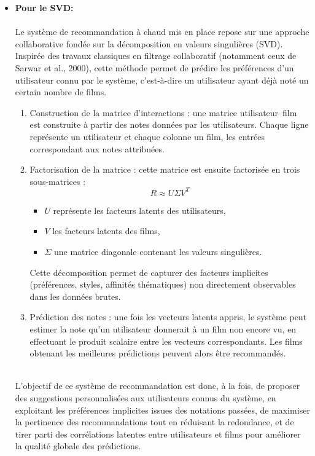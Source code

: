 \documentclass{article}
\begin{document}
\begin{itemize}
    \item \textbf{Pour le SVD:} \\
          $ $\\
          Le système de recommandation à chaud mis en place repose sur une approche collaborative fondée sur la décomposition en valeurs singulières (SVD).
          Inspirée des travaux classiques en filtrage collaboratif (notamment ceux de Sarwar et al., 2000), cette méthode permet de prédire les préférences d’un utilisateur connu par le système, c’est-à-dire un utilisateur ayant déjà noté un certain nombre de films.

          \begin{enumerate}
              \item Construction de la matrice d’interactions : une matrice utilisateur–film est construite à partir des notes données par les utilisateurs.
                    Chaque ligne représente un utilisateur et chaque colonne un film, les entrées correspondant aux notes attribuées.

              \item Factorisation de la matrice : cette matrice est ensuite factorisée en trois sous-matrices :\\
                    \[ R \approx U \Sigma V^T \]
                    \begin{itemize}
                        \item \(U\) représente les facteurs latents des utilisateurs,
                        \item \(V\) les facteurs latents des films,
                        \item \(\Sigma\) une matrice diagonale contenant les valeurs singulières.
                    \end{itemize}
                    Cette décomposition permet de capturer des facteurs implicites (préférences, styles, affinités thématiques) non directement observables dans les données brutes.
              \item Prédiction des notes : une fois les vecteurs latents appris, le système peut estimer la note qu’un utilisateur donnerait à un film non encore vu, en effectuant le produit scalaire entre les vecteurs correspondants.
                    Les films obtenant les meilleures prédictions peuvent alors être recommandés.
          \end{enumerate}
          $ $\\
          L’objectif de ce système de recommandation est donc, à la fois, de proposer des suggestions personnalisées aux utilisateurs connus du système,
          en exploitant les préférences implicites issues des notations passées, de maximiser la pertinence des recommandations tout en réduisant la redondance,
          et de tirer parti des corrélations latentes entre utilisateurs et films pour améliorer la qualité globale des prédictions.
          $ $\\


\end{itemize}
\end{document}
